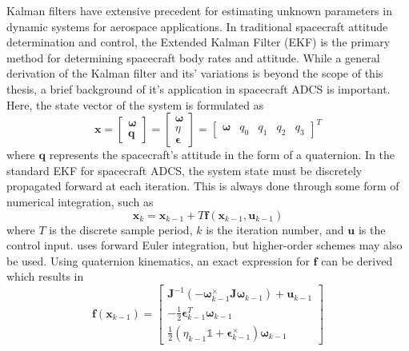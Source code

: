 Kalman filters have extensive precedent for estimating unknown parameters in dynamic systems for aerospace applications. In traditional spacecraft attitude determination and control, the Extended Kalman Filter (EKF) is the primary method for determining spacecraft body rates and attitude. While a general derivation of the Kalman filter and its' variations is beyond the scope of this thesis, a brief background of it's application in spacecraft ADCS is important. Here, the state vector of the system is formulated as
\begin{equation}\label{equation:EKF_state_vec}
    \bm{x} = \begin{bmatrix}\bm{\omega} \\ \bm{q} \end{bmatrix}
    =\begin{bmatrix}
        \bm{\omega} \\ \eta \\ \bm{\epsilon}
    \end{bmatrix}
    =\begin{bmatrix}
        \bm{\omega} & q_0 & q_1 & q_2 & q_3
    \end{bmatrix}^T
\end{equation}
where $\bm{q}$ represents the spacecraft's attitude in the form of a quaternion. In the standard EKF for spacecraft ADCS, the system state must be discretely propagated forward at each iteration. This is always done through some form of numerical integration, such as
\begin{equation}\label{equation:forward_euler}
    \bm{x}_{k} = \bm{x}_{k-1}+T\bm{f}(\bm{x}_{k-1},\bm{u}_{k-1})
\end{equation}
where $T$ is the discrete sample period, $k$ is the iteration number, and $\bm{u}$ is the control input.  uses forward Euler integration, but higher-order schemes may also be used. Using quaternion kinematics, an exact expression for $\bm{f}$ can be derived which results in
\begin{equation}
    \bm{f}(\bm{x}_{k-1})=
    \begin{bmatrix}
    
    \bm{J}^{-1}(-\bm{\omega}_{k-1}^{\times}\bm{J}\bm{\omega}_{k-1})+\bm{u}_{k-1} \\

    -\frac{1}{2}\bm{\epsilon}_{k-1}^T\bm{\omega}_{k-1} \\

    \frac{1}{2}(\eta_{k-1}\mathbb{1} +
    \bm{\epsilon}_{k-1}^{\times})\bm{\omega}_{k-1}

    \end{bmatrix}
\end{equation}
